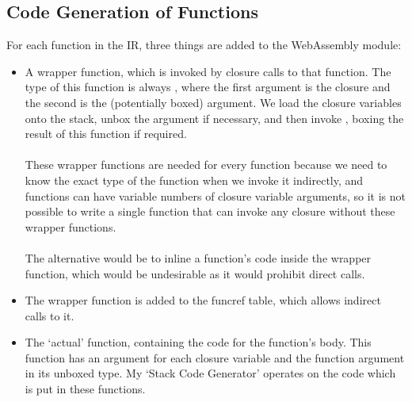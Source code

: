 \subsection{Code Generation of Functions}
For each function in the IR, three things are added to the WebAssembly module:
\begin{itemize}
\item A wrapper function, which is invoked by closure calls to that function. The type of this function is always , where the first argument is the closure and the second is the (potentially boxed) argument. We load the closure variables onto the stack, unbox the argument if necessary, and then invoke , boxing the result of this function if required.
\\\\
These wrapper functions are needed for every function because we need to know the exact type of the function when we invoke it indirectly, and functions can have variable numbers of closure variable arguments, so it is not possible to write a single function that can invoke any closure without these wrapper functions.
\\\\
The alternative would be to inline a function's code inside the wrapper function, which would be undesirable as it would prohibit direct calls.
\item The wrapper function is added to the funcref table, which allows indirect calls to it.
\item The `actual' function, containing the code for the function's body. This function has an argument for each closure variable and the function argument in its unboxed type. My `Stack Code Generator' operates on the code which is put in these functions.
\end{itemize}

